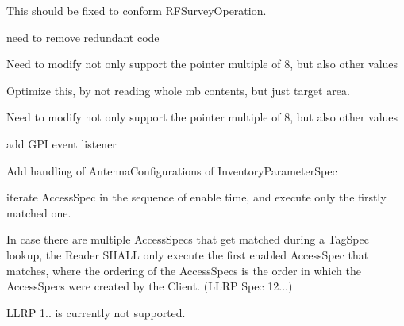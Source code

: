 
\begin{DoxyRefList}
\item[\label{todo__todo000001}%
\hypertarget{todo__todo000001}{}%
Member \hyperlink{class_e_l_f_i_n_1_1_abstract_antenna_operation_af8cd8a5e57d157a3af20c28c6e573bfb}{E\-L\-F\-I\-N\-:\-:Abstract\-Antenna\-Operation\-:\-:run} ()=0]This should be fixed to conform R\-F\-Survey\-Operation.  
\item[\label{todo__todo000002}%
\hypertarget{todo__todo000002}{}%
Member \hyperlink{class_e_l_f_i_n_1_1_access_operation_a9f928363dd0ab1a6a0ef2f3e594e60a4}{E\-L\-F\-I\-N\-:\-:Access\-Operation\-:\-:match\-Tag\-Spec} (Stub\-Tag $\ast$p\-Stub\-Tag, L\-L\-R\-P\-::llrp\-\_\-u32\-\_\-t p\-R\-O\-Spec\-I\-D)]need to remove redundant code 

Need to modify not only support the pointer multiple of 8, but also other values 

Optimize this, by not reading whole mb contents, but just target area. 

Need to modify not only support the pointer multiple of 8, but also other values  
\item[\label{todo__todo000006}%
\hypertarget{todo__todo000006}{}%
Member \hyperlink{class_e_l_f_i_n_1_1_a_i_operation_a13259c8516e1b5fb465e553c4c5dae01}{E\-L\-F\-I\-N\-:\-:A\-I\-Operation\-:\-:run} ()]add G\-P\-I event listener 

Add handling of Antenna\-Configurations of Inventory\-Parameter\-Spec 

iterate Access\-Spec in the sequence of enable time, and execute only the firstly matched one.  
\item[\label{todo__todo000009}%
\hypertarget{todo__todo000009}{}%
Member \hyperlink{class_e_l_f_i_n_1_1_a_o_admin_ac493ec01485f6a3359958919ddace01a}{E\-L\-F\-I\-N\-:\-:A\-O\-Admin\-:\-:add\-Access\-Spec} (L\-L\-R\-P\-::\-C\-Access\-Spec $\ast$a\-Access\-Spec)]In case there are multiple Access\-Specs that get matched during a Tag\-Spec lookup, the Reader S\-H\-A\-L\-L only execute the first enabled Access\-Spec that matches, where the ordering of the Access\-Specs is the order in which the Access\-Specs were created by the Client. (L\-L\-R\-P Spec 12...)  
\item[\label{todo__todo000012}%
\hypertarget{todo__todo000012}{}%
Member \hyperlink{class_e_l_f_i_n_1_1_l_l_r_p_core_a1e32c1a8d11bcf11f5d8143eac90fd91}{E\-L\-F\-I\-N\-:\-:L\-L\-R\-P\-Core\-:\-:handle\-Set\-Protocol\-Version} (L\-L\-R\-P\-::\-C\-Message $\ast$\-\_\-p\-Cmd, L\-L\-R\-P\-::\-C\-Message $\ast$$\ast$\-\_\-p\-Rsp)]L\-L\-R\-P 1.. is currently not supported. 


\end{DoxyRefList}
